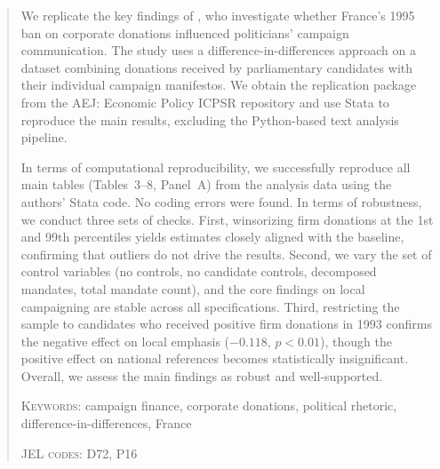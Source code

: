 \documentclass[12pt,a4paper]{article}
\begin{document}
\renewcommand{\abstractname}{Abstract}
\begin{abstract}

 

We replicate the key findings of \cite{Cage}, who investigate whether France's 1995 ban on corporate donations influenced politicians' campaign communication. The study uses a difference-in-differences approach on a dataset combining donations received by parliamentary candidates with their individual campaign manifestos. We obtain the replication package from the AEJ: Economic Policy ICPSR repository and use Stata to reproduce the main results, excluding the Python-based text analysis pipeline.

In terms of computational reproducibility, we successfully reproduce all main tables (Tables~3--8, Panel~A) from the analysis data using the authors' Stata code. No coding errors were found. In terms of robustness, we conduct three sets of checks. First, winsorizing firm donations at the 1st and 99th percentiles yields estimates closely aligned with the baseline, confirming that outliers do not drive the results. Second, we vary the set of control variables (no controls, no candidate controls, decomposed mandates, total mandate count), and the core findings on local campaigning are stable across all specifications. Third, restricting the sample to candidates who received positive firm donations in 1993 confirms the negative effect on local emphasis ($-0.118$, $p<0.01$), though the positive effect on national references becomes statistically insignificant. Overall, we assess the main findings as robust and well-supported.
\newline

\textsc{Keywords}: campaign finance, corporate donations, political rhetoric, difference-in-differences, France \newline

\textsc{JEL codes}: D72, P16
\end{abstract}

\clearpage
\end{document}
